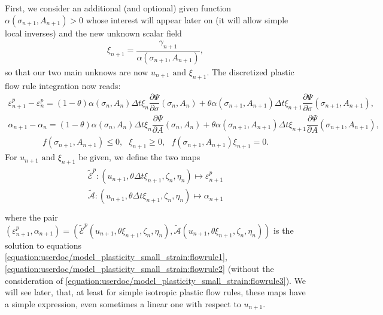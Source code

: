 \documentclass[a4paper,11pt,english]{sphinxmanual}
\begin{document}
First, we consider an additional (and optional) given function \(\alpha(\sigma_{n+1}, A_{n+1}) > 0\) whose interest will appear later on (it will allow simple local inverses) and the new unknown scalar field
\begin{equation*}
\begin{split}\xi_{n+1} = \dfrac{\gamma_{n+1}}{\alpha(\sigma_{n+1}, A_{n+1})} ,\end{split}
\end{equation*}
so that our two main unknows are now \(u_{n+1} \mbox{ and } \xi_{n+1}\). The discretized plastic flow rule integration now reads:
\begin{equation}\label{equation:userdoc/model_plasticity_small_strain:flowrule1}
\begin{split}\varepsilon^p_{n+1} - \varepsilon^p_{n} = (1-\theta)\alpha(\sigma_n,A_n)\Delta t \xi_n \dfrac{\partial \Psi}{\partial \sigma}(\sigma_{n}, A_{n}) + \theta \alpha(\sigma_{n+1},A_{n+1}) \Delta t \xi_{n+1} \dfrac{\partial \Psi}{\partial \sigma}(\sigma_{n+1}, A_{n+1}),\end{split}
\end{equation}\begin{equation}\label{equation:userdoc/model_plasticity_small_strain:flowrule2}
\begin{split}\alpha_{n+1} - \alpha_n = (1-\theta) \alpha(\sigma_n,A_n)\Delta t \xi_n \dfrac{\partial \Psi}{\partial A}(\sigma_{n}, A_{n}) + \theta \alpha(\sigma_{n+1},A_{n+1}) \Delta t \xi_{n+1} \dfrac{\partial \Psi}{\partial A}(\sigma_{n+1}, A_{n+1}),\end{split}
\end{equation}\begin{equation}\label{equation:userdoc/model_plasticity_small_strain:flowrule3}
\begin{split}f(\sigma_{n+1}, A_{n+1}) \le 0, ~~~ \xi_{n+1} \ge 0, ~~~ f(\sigma_{n+1}, A_{n+1}) \xi_{n+1} = 0.\end{split}
\end{equation}
For \(u_{n+1} \mbox{ and } \xi_{n+1}\) be given, we define the two maps
\begin{align*}\!\begin{aligned}
\tilde{\mathscr E}^p : (u_{n+1}, \theta \Delta t \xi_{n+1}, \zeta_{n}, \eta_n) \mapsto \varepsilon^p_{n+1}\\
\tilde{\mathscr A} : (u_{n+1}, \theta \Delta t \xi_{n+1}, \zeta_{n}, \eta_n) \mapsto \alpha_{n+1}\\
\end{aligned}\end{align*}
where the pair \((\varepsilon^p_{n+1}, \alpha_{n+1}) = (\tilde{\mathscr E}^p(u_{n+1}, \theta \xi_{n+1}, \zeta_{n}, \eta_n), \tilde{\mathscr A}(u_{n+1}, \theta \xi_{n+1}, \zeta_{n}, \eta_n))\) is the solution to equations \eqref{equation:userdoc/model_plasticity_small_strain:flowrule1}, \eqref{equation:userdoc/model_plasticity_small_strain:flowrule2} (without the consideration of  \eqref{equation:userdoc/model_plasticity_small_strain:flowrule3}). We will see later, that, at least for simple isotropic plastic flow rules, these maps have a simple expression, even sometimes a linear one with respect to \(u_{n+1}\).
\end{document}
